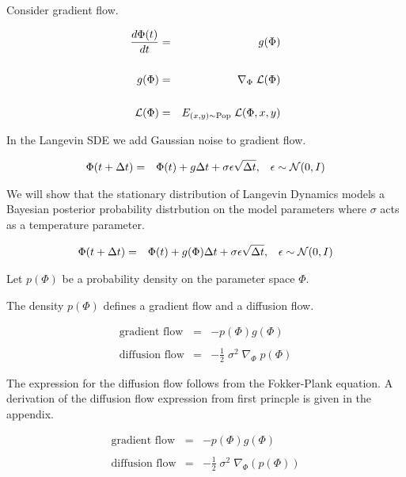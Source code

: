 {

Consider gradient flow.

\begin{eqnarray*}
\frac{d\Phi(t)}{dt} & = & g(\Phi) \\
\\
g(\Phi) & = & \nabla_\Phi\;{\cal L}(\Phi) \\
\\
{\cal L}(\Phi) & = & E_{(x,y) \sim \mathrm{Pop}}\;{\cal L}(\Phi,x,y)
\end{eqnarray*}


In the Langevin SDE we add Gaussian noise to gradient flow.

\begin{eqnarray*}
\Phi(t + \Delta t) & = & \Phi(t) + g\Delta t + \sigma \epsilon \sqrt{\Delta t},\;\;\;\epsilon \sim {\cal N}(0,I)
\end{eqnarray*}

\vfill
We will show that the stationary distribution of Langevin Dynamics models a Bayesian posterior probability distrbution on
the model parameters where $\sigma$ acts as a temperature parameter.



\begin{eqnarray*}
\Phi(t + \Delta t) & = & \Phi(t) + g(\Phi)\Delta t + \sigma\epsilon \sqrt{\Delta t},\;\;\;\epsilon \sim {\cal N}(0,I)
\end{eqnarray*}

Let $p(\Phi)$ be a probability density on the parameter space $\Phi$.

\vfill
The density $p(\Phi)$ defines a gradient flow and a diffusion flow.

\begin{eqnarray*}
\mbox{gradient flow} & = & - p(\Phi)g(\Phi) \\
\\
\mbox{diffusion flow} & = & - \frac{1}{2} \;\sigma^2\;\nabla_\Phi\; p(\Phi)
\end{eqnarray*}

\vfill
The expression for the diffusion flow follows from the Fokker-Plank equation. A derivation of the diffusion flow expression from first princple is given in the appendix.


\begin{eqnarray*}
\mbox{gradient flow} & = & - p(\Phi)g(\Phi) \\
\\
\mbox{diffusion flow} & = & - \frac{1}{2} \;\sigma^2\;\nabla_\Phi(p(\Phi))
\end{eqnarray*}

}
